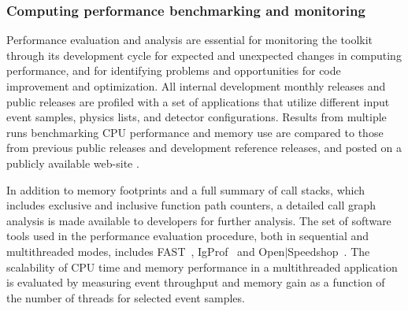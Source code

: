 
\subsubsection{Computing performance benchmarking and monitoring}

Performance evaluation and analysis are essential for monitoring the \Gfour{}
toolkit through its development cycle for expected and unexpected changes in
computing performance, and for identifying problems and opportunities for code
improvement and optimization.  All internal development monthly releases and 
public releases are profiled with a set of applications that utilize different
input event samples, physics lists, and detector configurations.  Results from
multiple runs benchmarking CPU performance and memory use are compared to those
from previous public releases and development reference releases, and posted on
a publicly available web-site \cite{tools:g4cpt}.
  
In addition to memory footprints and a full summary of call stacks, which 
includes exclusive and inclusive function path counters, a detailed call graph
analysis is made available to \Gfour{} developers for further analysis.  The set
of software tools used in the performance evaluation procedure, both in 
sequential and multithreaded modes, includes FAST~\cite{tools:FAST}, 
IgProf~\cite{tools:IgProf} and Open$\mid$Speedshop~\cite{tools:OSS}.  The 
scalability of CPU time and memory performance in a multithreaded application is
evaluated by measuring event throughput and memory gain as a function of the 
number of threads for selected event samples.
